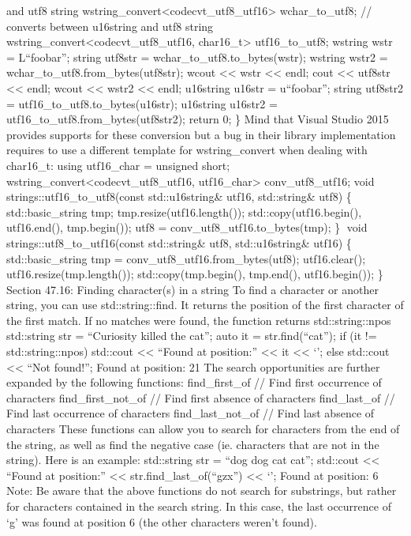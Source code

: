 and utf8 string
wstring\_convert\textless codecvt\_utf8\_utf16\textgreater{}
wchar\_to\_utf8; // converts between u16string and utf8 string
wstring\_convert\textless codecvt\_utf8\_utf16, char16\_t\textgreater{}
utf16\_to\_utf8; wstring wstr = L``foobar''; string utf8str =
wchar\_to\_utf8.to\_bytes(wstr); wstring wstr2 =
wchar\_to\_utf8.from\_bytes(utf8str); wcout \textless\textless{} wstr
\textless\textless{} endl; cout \textless\textless{} utf8str
\textless\textless{} endl; wcout \textless\textless{} wstr2
\textless\textless{} endl; u16string u16str = u``foobar''; string
utf8str2 = utf16\_to\_utf8.to\_bytes(u16str); u16string u16str2 =
utf16\_to\_utf8.from\_bytes(utf8str2); return 0; \} Mind that Visual
Studio 2015 provides supports for these conversion but a bug in their
library implementation requires to use a diﬀerent template for
wstring\_convert when dealing with char16\_t: using utf16\_char =
unsigned short; wstring\_convert\textless codecvt\_utf8\_utf16,
utf16\_char\textgreater{} conv\_utf8\_utf16; void
strings::utf16\_to\_utf8(const std::u16string\& utf16, std::string\&
utf8) \{ std::basic\_string tmp; tmp.resize(utf16.length());
std::copy(utf16.begin(), utf16.end(), tmp.begin()); utf8 =
conv\_utf8\_utf16.to\_bytes(tmp); \} void
strings::utf8\_to\_utf16(const std::string\& utf8, std::u16string\&
utf16) \{ std::basic\_string tmp = conv\_utf8\_utf16.from\_bytes(utf8);
utf16.clear(); utf16.resize(tmp.length()); std::copy(tmp.begin(),
tmp.end(), utf16.begin()); \} Section 47.16: Finding character(s) in a
string To ﬁnd a character or another string, you can use
std::string::find. It returns the position of the ﬁrst character of the
ﬁrst match. If no matches were found, the function returns
std::string::npos std::string str = ``Curiosity killed the cat''; auto
it = str.find(``cat''); if (it != std::string::npos) std::cout
\textless\textless{} ``Found at position:'' \textless\textless{} it
\textless\textless{} `\n'; else std::cout \textless\textless{} ``Not
found!\n''; Found at position: 21 The search opportunities are further
expanded by the following functions: find\_first\_of // Find first
occurrence of characters find\_first\_not\_of // Find first absence of
characters find\_last\_of // Find last occurrence of characters
find\_last\_not\_of // Find last absence of characters These functions
can allow you to search for characters from the end of the string, as
well as ﬁnd the negative case (ie. characters that are not in the
string). Here is an example: std::string str = ``dog dog cat cat'';
std::cout \textless\textless{} ``Found at position:''
\textless\textless{} str.find\_last\_of(``gzx'') \textless\textless{}
`\n'; Found at position: 6 Note: Be aware that the above functions do
not search for substrings, but rather for characters contained in the
search string. In this case, the last occurrence of `g' was found at
position 6 (the other characters weren't found).

